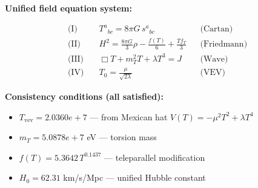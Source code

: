 
\textbf{Unified field equation system:}

\begin{align}
  \text{(I)} \quad & T^a{}_{bc} = 8\pi G \, s^a{}_{bc} && \text{(Cartan)} \\
  \text{(II)} \quad & H^2 = \frac{8\pi G}{3}\rho - \frac{f(T)}{6} + \frac{Tf_T}{3} && \text{(Friedmann)} \\
  \text{(III)} \quad & \Box T + m_T^2 T + \lambda T^3 = J && \text{(Wave)} \\
  \text{(IV)} \quad & T_0 = \frac{\mu}{\sqrt{2\lambda}} && \text{(VEV)}
\end{align}

\textbf{Consistency conditions (all satisfied):}
\begin{itemize}
  \item $T_{\text{vev}} = 2.0360e+7$ — from Mexican hat $V(T) = -\mu^2 T^2 + \lambda T^4$
  \item $m_T = 5.0878e+7$ eV — torsion mass
  \item $f(T) = 5.3642 \, T^{0.1437}$ — teleparallel modification
  \item $H_0 = 62.31$ km/s/Mpc — unified Hubble constant
\end{itemize}